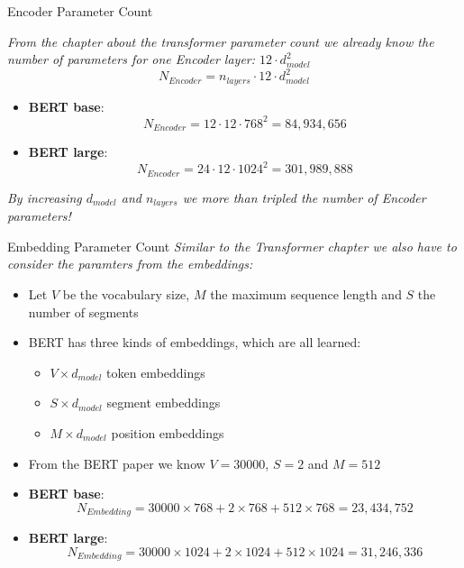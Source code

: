 
\begin{frame}{Encoder Parameter Count}

\textit{From the chapter about the transformer parameter count we already know the number of parameters for one Encoder layer: $12\cdot d_{model}^2$}
$$
N_{Encoder} = n_{layers} \cdot 12\cdot d_{model}^2
$$

\begin{itemize}
	\item \textbf{BERT base}:
	$$N_{Encoder} = 12\cdot 12\cdot 768^2 = 84,934,656$$
	\item \textbf{BERT large}:
	$$N_{Encoder} = 24\cdot 12\cdot 1024^2 = 301,989,888$$
\end{itemize}

\textit{By increasing $d_{model}$ and $n_{layers}$ we more than tripled the number of Encoder parameters!}
\end{frame}


\begin{frame}{Embedding Parameter Count}
\textit{Similar to the Transformer chapter we also have to consider the paramters from the embeddings:}

\begin{itemize}
	\item Let $V$ be the vocabulary size, $M$ the maximum sequence length and $S$ the number of segments
	\item BERT has three kinds of embeddings, which are all learned:
	\begin{itemize}
		\item $V \times d_{model}$ token embeddings
		\item $S \times d_{model}$ segment embeddings
		\item $M \times d_{model}$ position embeddings
	\end{itemize}
	\item From the BERT paper we know $V=30000$, $S = 2$ and $M = 512$ 
	\item \textbf{BERT base}:
	$$N_{Embedding} = 30000\times 768 + 2\times 768 + 512\times 768 = 23,434,752$$
	\item \textbf{BERT large}:
	$$N_{Embedding} = 30000\times 1024 +2\times 1024 + 512\times 1024 = 31,246,336$$
\end{itemize}
	
\end{frame}

